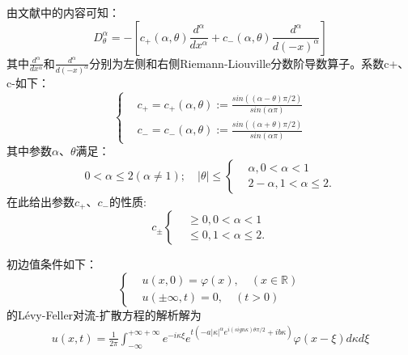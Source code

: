 由文献\cite{lqx2007}中的内容可知：
$$D_{\theta}^{\alpha}=-\left[c_{+}(\alpha, \theta) \frac{d^{\alpha}}{d x^{\alpha}}+c_{-}(\alpha, \theta) \frac{d^{\alpha}}{d(-x)^{\alpha}}\right]$$
其中$\frac{d^{\alpha}}{dx^{\alpha}}$和$\frac{d^{\alpha}}{d(-x)^{\alpha}}$分别为左侧和右侧Riemann-Liouville分数阶导数算子。系数c+、c-如下：
\begin{equation*}
		\left\{
	\begin{aligned}
		& c_{+} = c_{+}(\alpha,\theta) := \frac{sin((\alpha-\theta)\pi/2)}{sin(\alpha\pi)}
	\\	& c_{-} = c_{-}(\alpha,\theta) := \frac{sin((\alpha+\theta)\pi/2)}{sin(\alpha\pi)}
	\end{aligned}
	\right.	
\end{equation*}
其中参数$\alpha$、$\theta$满足：
\begin{equation*}
	0 < \alpha \leq 2(\alpha \neq 1);\quad |\theta| \leq \left\{
	\begin{aligned}
		& \alpha, 0 < \alpha <1
	\\  & 2-\alpha, 1 < \alpha \leq 2.
	\end{aligned}
	\right.
\end{equation*}
在此给出参数$c_{+}、c_{-}$的性质:
\begin{equation*}
c_{\pm}\left\{
\begin{aligned}
& \geq 0, 0 < \alpha <1
\\  & \leq 0, 1 < \alpha \leq 2.
\end{aligned}
\right.	
\end{equation*}

\begin{lemma}
	初边值条件如下：
	\begin{equation*}
		\left\{
		\begin{aligned}
			& u(x, 0)=\varphi(x), \quad (x \in \mathbb{R}) 
			\\	& u( \pm \infty, t)=0, \quad (t>0)
		\end{aligned}
		\right.
	\end{equation*}	
	的Lévy-Feller对流-扩散方程的解析解为
	\begin{equation*}
		\begin{aligned}
			u(x, t) =\frac{1}{2 \pi} \int_{-\infty}^{+\infty+\infty} e^{-i \kappa \xi} e^{t\left(-a|\kappa|^{\alpha} e^{i(s i g n \kappa) \theta \pi / 2}+i b \kappa\right)} \varphi(x-\xi) d \kappa d \xi
		\end{aligned}
	\end{equation*}
\end{lemma}

